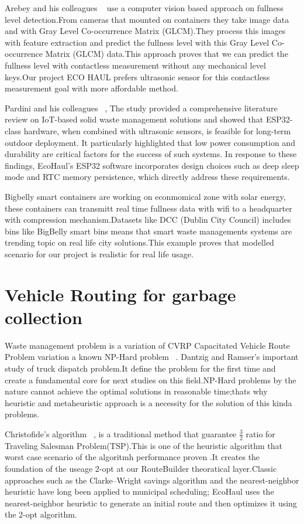\documentclass[12pt,a4paper]{report}
\begin{document}
\indent Arebey and his colleagues ~\cite{gutierrez2015} use a computer vision based approach on fullness level detection.From cameras that mounted on containers they take image data and with Gray Level Co-occurrence Matrix (GLCM).They process this images with feature extraction and predict the fullness level with this Gray Level Co-occurrence Matrix (GLCM) data.This approach proves that we can predict the fullness level with contactless  measurement without any mechanical level keys.Our project ECO HAUL prefers ultrasonic sensor for this contactless  measurement goal with more affordable method.


\indent Pardini and his colleagues ~\cite{pardini2018}, The study provided a comprehensive literature review on IoT-based solid waste management solutions and showed that ESP32-class hardware, when combined with ultrasonic sensors, is feasible for long-term outdoor deployment. It particularly highlighted that low power consumption and durability are critical factors for the success of such systems. In response to these findings, EcoHaul’s ESP32 software incorporates design choices such as deep sleep mode and RTC memory persistence, which directly address these requirements.

\indent Bigbelly smart containers are working on econmomical zone with solar energy, these containers can transmitt real time fullness data with wifi to a headquarter with compression mechanism.Datasets like DCC (Dublin City Council) includes bins like BigBelly smart bins means that smart waste managements systems are trending topic on real life city solutions.This example proves that modelled scenario for our project is realistic for real life usage.

\section{Vehicle Routing for garbage collection}

\indent Waste management problem is a variation of CVRP Capacitated Vehicle Route Problem variation a known NP-Hard problem ~\cite{dantzig1959}. Dantzig and Ramser's important study of truck dispatch problem.It define the problem for the first time and create a fundamental core for next studies on this field.NP-Hard problems by the nature cannot achieve the optimal solutions in reasonable time;thats why heuristic and metaheuristic approach is a necessity for the solution of this kinda problems.


\indent Christofide's algorithm ~\cite{christofides1976}, is a traditional method that guarantee $\frac{3}{2}$ ratio for Traveling Salesman Problem(TSP).This is one of the heuristic algorithm that worst case scenario of the algoritmh performance proven .It creates the foundation of the useage 2-opt at our RouteBuilder  theoratical layer.Classic approaches such as the Clarke–Wright savings algorithm and the nearest-neighbor heuristic have long been applied to municipal scheduling; EcoHaul uses the nearest-neighbor heuristic to generate an initial route and then optimizes it using the 2-opt algorithm.
\end{document}
